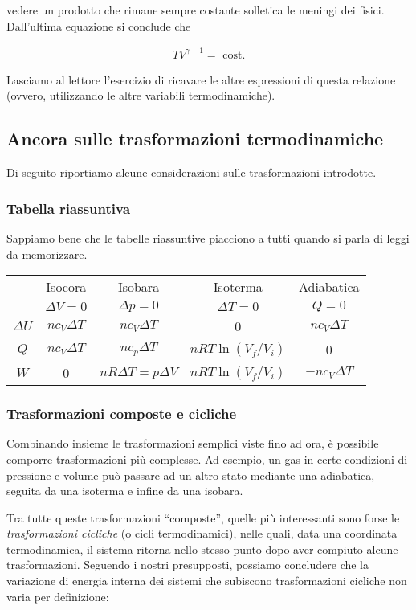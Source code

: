 \noindent vedere un prodotto che rimane sempre costante solletica le
meningi dei fisici. Dall'ultima equazione si conclude che

\begin{align}
    TV^{\gamma - 1} = \text{ cost.}
\end{align}

\noindent Lasciamo al lettore l'esercizio di ricavare le altre
espressioni di questa relazione (ovvero, utilizzando le altre
variabili termodinamiche).

\subsection{Ancora sulle trasformazioni termodinamiche}
Di seguito riportiamo alcune considerazioni sulle trasformazioni
introdotte.

\subsubsection*{Tabella riassuntiva}
Sappiamo bene che le tabelle riassuntive piacciono a tutti quando
si parla di leggi da memorizzare.

\begin{center}
    \begin{tabular}{c | c | c | c | c}
        & Isocora & Isobara & Isoterma & Adiabatica\\
        & $\Delta V = 0$ & $\Delta p = 0$ & $\Delta T = 0$ & $Q = 0$\\
        \hline
        $\Delta U$ & $nc_V\Delta T$ & $nc_V\Delta T$ & 0 & $nc_V\Delta T$\\
        \hline
        $Q$ & $nc_V\Delta T$ & $nc_p\Delta T$ & $nRT\ln(V_f/V_i)$ & 0\\
        \hline
        $W$ & 0 & $nR\Delta T = p\Delta V$ & $nRT\ln(V_f/V_i)$ & $-nc_V\Delta T$
    \end{tabular}
\end{center}

\subsubsection*{Trasformazioni composte e cicliche}
Combinando insieme le trasformazioni semplici viste fino ad ora, è possibile
comporre trasformazioni più complesse. Ad esempio, un gas in certe
condizioni di pressione e volume può passare ad un altro stato mediante
una adiabatica, seguita da una isoterma e infine da una isobara.

Tra tutte queste trasformazioni ``composte'', quelle più interessanti
sono forse le \textit{trasformazioni cicliche} (o cicli termodinamici), nelle
quali, data una coordinata termodinamica, il sistema ritorna nello stesso
punto dopo aver compiuto alcune trasformazioni. Seguendo i nostri presupposti,
possiamo concludere che la variazione di energia interna dei sistemi che
subiscono trasformazioni cicliche non varia per definizione:

